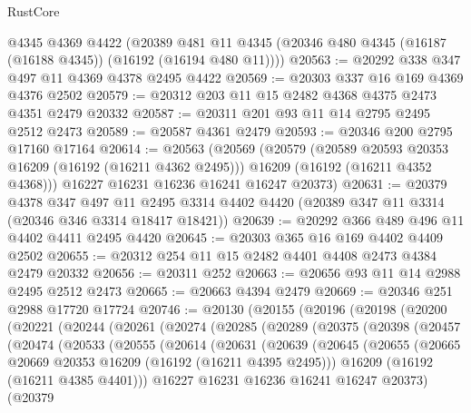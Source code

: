 \begin{lexlean}{RustCore}
\begin{coremodule}
    @4345
    @4369
    @4422
    (@20389 @481 @11 @4345 (@20346 @480 @4345 (@16187 (@16188 @4345)) (@16192 (@16194 @480 @11))))
@20563 := @20292 @338 @347 @497 @11 @4369 @4378 @2495 @4422
@20569 := @20303 @337 @16 @169 @4369 @4376 @2502
@20579 := @20312 @203 @11 @15 @2482 @4368 @4375 @2473 @4351 @2479 @20332
@20587 := @20311 @201 @93 @11 @14 @2795 @2495 @2512 @2473
@20589 := @20587 @4361 @2479
@20593 := @20346 @200 @2795 @17160 @17164
@20614 := @20563
    (@20569
      (@20579
        (@20589 @20593 @20353 @16209 (@16192 (@16211 @4362 @2495)))
        @16209
        (@16192 (@16211 @4352 @4368)))
      @16227
      @16231
      @16236
      @16241
      @16247
      @20373)
@20631 := @20379
    @4378
    @347
    @497
    @11
    @2495
    @3314
    @4402
    @4420
    (@20389 @347 @11 @3314 (@20346 @346 @3314 @18417 @18421))
@20639 := @20292 @366 @489 @496 @11 @4402 @4411 @2495 @4420
@20645 := @20303 @365 @16 @169 @4402 @4409 @2502
@20655 := @20312 @254 @11 @15 @2482 @4401 @4408 @2473 @4384 @2479 @20332
@20656 := @20311 @252
@20663 := @20656 @93 @11 @14 @2988 @2495 @2512 @2473
@20665 := @20663 @4394 @2479
@20669 := @20346 @251 @2988 @17720 @17724
@20746 := @20130
    (@20155
      (@20196
        (@20198
          (@20200
            (@20221
              (@20244
                (@20261
                  (@20274
                    (@20285
                      (@20289
                        (@20375
                          (@20398
                            (@20457
                              (@20474
                                (@20533
                                  (@20555
                                    (@20614
                                      (@20631
                                        (@20639
                                          (@20645
                                            (@20655
                                              (@20665
                                                @20669
                                                @20353
                                                @16209
                                                (@16192 (@16211 @4395 @2495)))
                                              @16209
                                              (@16192 (@16211 @4385 @4401)))
                                            @16227
                                            @16231
                                            @16236
                                            @16241
                                            @16247
                                            @20373)
                                          (@20379

\end{coremodule}
\end{lexlean}
